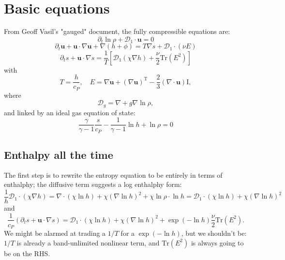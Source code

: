 \documentclass{aastex62}
\newcommand{\del}{\nabla}
\renewcommand{\vec}{\boldsymbol}
\newcommand{\scrD}{\mathcal{D}}
\begin{document}
\section{Basic equations}
From Geoff Vasil's "gauged" document, the fully compressible equations are:
\begin{equation}
  \partial_t \ln \rho + \scrD_1 \cdot \vec{u} = 0
\end{equation}
\begin{equation}
  \partial_t \vec{u} + \vec{u}\cdot \del \vec{u} + \del (h + \phi) = T\del s + \vec{\scrD}_1\cdot(\nu E)
\end{equation}
\begin{equation}
  \partial_t s + \vec{u}\cdot \del s = \frac{1}{T}\left[\vec{\scrD}_1 (\chi \del h) + \frac{\nu}{2}\mathrm{Tr}(E^2)\right]
\end{equation}
with
\begin{equation}
  T = \frac{h}{c_P}, \quad E = \del \vec{u} + (\del \vec{u})^\mathrm{T} - \frac{2}{3}(\del\cdot\vec{u})\mathrm{I},
\end{equation}
where
\begin{equation}
  \vec{\scrD}_g = \del + g \del \ln \rho,
\end{equation}
and linked by an ideal gas equation of state:
\begin{equation}
  \frac{\gamma}{\gamma-1} \frac{s}{c_P} - \frac{1}{\gamma - 1}\ln h + \ln \rho =0
\end{equation}

\subsection{Enthalpy all the time}
The first step is to rewrite the entropy equation to be entirely in terms of enthalphy; the diffusive term suggests a log enthalphy form:
\begin{equation}
  \frac{1}{h} \vec{\scrD}_1 \cdot (\chi \del h) =
  \del\cdot(\chi \ln h) + \chi (\del \ln h)^2 + \chi \ln \rho \cdot \ln h
  = \vec{\scrD}_1 \cdot (\chi \ln h) + \chi (\del \ln h)^2
\end{equation}
and
\begin{equation}
\frac{1}{c_P}\left(\partial_t s + \vec{u}\cdot \del s\right) = \vec{\scrD}_1 \cdot (\chi \ln h) + \chi (\del \ln h)^2 + \exp{(-\ln h)}\frac{\nu}{2}\mathrm{Tr}(E^2).
\end{equation}
We might be alarmed at trading a $1/T$ for a $\exp{(-\ln h)}$, but we shouldn't be: $1/T$ is already a band-unlimited nonlinear term, and $\mathrm{Tr}(E^2)$ is always going to be on the RHS.
\end{document}
